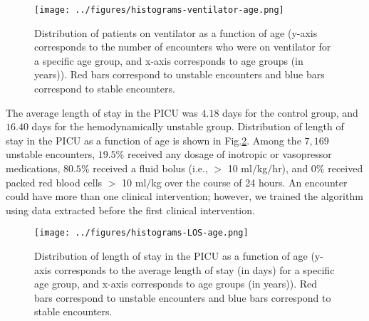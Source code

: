 \documentclass[
   technote
]{phildoc}
\newcommand{\ie}{i.e.,}
\newcommand{\fig}{Fig.}
\begin{document}
\begin{figure}[h!]
	\centering
	\texttt{[image: ../figures/histograms-ventilator-age.png]}
	\caption{Distribution of patients on ventilator as a function of age (y-axis corresponds to the number of encounters who were on ventilator for a specific age group, and x-axis corresponds to age groups (in years)). Red bars correspond to unstable encounters and blue bars correspond to stable encounters.} 
	\label{fig:histogram_vent-age}      
\end{figure}

The average length of stay in the PICU was $4.18$ days for the control group, and $16.40$ days for the hemodynamically unstable group. Distribution of length of stay in the PICU as a function of age is shown in \fig{}\ref{fig:los_age_pdf}. Among the $7,169$ unstable encounters, $19.5\%$ received any dosage of inotropic or vasopressor medications, $80.5\%$ received a fluid bolus (\ie{} $>$ 10 ml$/$kg$/$hr), and $0\%$ received packed red blood cells $>$ 10 ml$/$kg over the course of 24 hours. An encounter could have more than one clinical intervention; however, we trained the algorithm using data extracted before the first clinical intervention.   

\begin{figure}[h!]
	\centering
	\texttt{[image: ../figures/histograms-LOS-age.png]}
	\caption{Distribution of length of stay in the PICU as a function of age (y-axis corresponds to the average length of stay (in days) for a specific age group, and x-axis corresponds to age groups (in years)). Red bars correspond to unstable encounters and blue bars correspond to stable encounters.} 
	\label{fig:los_age_pdf}      
\end{figure}


\end{document}
